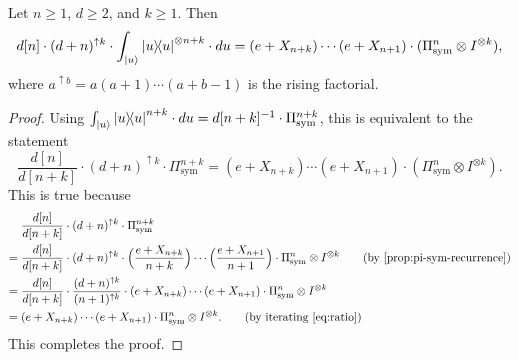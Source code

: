 \documentclass{article}
\begin{document}
\begin{lemma} \label{lem:Helper_lemma}
Let $n \geq 1$, $d \geq 2$, and $k \geq 1$. Then
\begin{equation*}
d[n] \cdot (d+n)^{\uparrow k} \cdot \int_{ \ket{u}} \ketbra{u}^{\otimes n+k} \cdot du
= (e + X_{n+k}) \cdots (e + X_{n+1}) \cdot (\Pi_{\mathrm{sym}}^{n} \otimes I^{\otimes k}),
\end{equation*}
where $a^{\uparrow b} = a (a+1) \cdots (a + b-1)$ is the rising factorial.
\end{lemma}
\begin{proof}
    Using $\int_{\ket{u}} \ketbra{u}^{n +k} \cdot du = d[n+k]^{-1} \cdot \Pi_{\mathrm{sym}}^{n+k}$, this is equivalent to the statement
    \begin{equation*}
        \frac{d[n]}{d[n+k]} \cdot (d+n)^{\uparrow k} \cdot \Pi_{\mathrm{sym}}^{n+k} = (e + X_{n+k}) \cdots (e + X_{n+1}) \cdot (\Pi_{\mathrm{sym}}^{n} \otimes I^{\otimes k}).
    \end{equation*}
    This is true because
    \begin{align*}
        &\frac{d[n]}{d[n+k]} \cdot (d+n)^{\uparrow k} \cdot \Pi_{\mathrm{sym}}^{n+k}\\
        ={}& \frac{d[n]}{d[n+k]} \cdot (d+n)^{\uparrow k} \cdot \Big(\frac{e+X_{n+k}}{n+k}\Big) \cdots \Big(\frac{e+X_{n+1}}{n+1}\Big) \cdot \Pi_{\mathrm{sym}}^{n} \otimes I^{\otimes k} \tag{by \Cref{prop:pi-sym-recurrence}}\\
        ={}& \frac{d[n]}{d[n+k]} \cdot \frac{(d+n)^{\uparrow k}}{(n+1)^{\uparrow k}} \cdot (e+X_{n+k}) \cdots (e+X_{n+1}) \cdot \Pi_{\mathrm{sym}}^{n} \otimes I^{\otimes k}\\
        ={}& (e+X_{n+k}) \cdots (e+X_{n+1}) \cdot \Pi_{\mathrm{sym}}^{n} \otimes I^{\otimes k}. \tag{by iterating \Cref{eq:ratio}}
    \end{align*}
    This completes the proof.
\end{proof}
\end{document}
